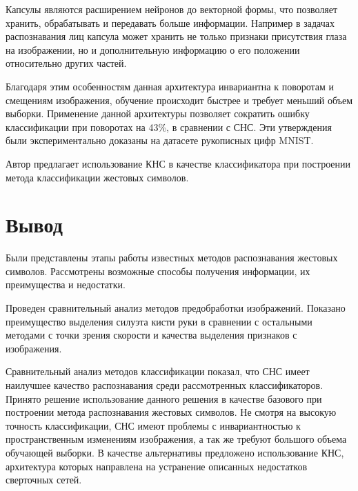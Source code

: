 Капсулы являются расширением нейронов до векторной формы, что позволяет хранить, обрабатывать и передавать больше информации. Например в задачах распознавания лиц капсула может хранить не только признаки присутствия глаза на изображении, но и дополнительную информацию о его положении относительно других частей.

Благодаря этим особенностям данная архитектура инвариантна к поворотам и смещениям изображения, обучение происходит быстрее и требует меньший объем выборки. Применение данной архитектуры позволяет сократить ошибку классификации при поворотах на 43\%, в сравнении с СНС\cite{em}. Эти утверждения были экспериментально доказаны на датасете рукописных цифр MNIST\cite{sabour2017dynamic}.

Автор предлагает использование КНС в качестве классификатора при построении метода классификации жестовых символов.

\section{Вывод}

Были представлены этапы работы известных методов распознавания жестовых символов. Рассмотрены возможные способы получения информации, их преимущества и недостатки. 

Проведен сравнительный анализ методов предобработки изображений. Показано преимущество выделения силуэта кисти руки в сравнении с остальными методами с точки зрения скорости и качества выделения признаков с изображения.

Сравнительный анализ методов классификации показал, что СНС имеет наилучшее качество распознавания среди рассмотренных классификаторов. Принято решение использование данного решения в качестве базового при построении метода распознавания жестовых символов. Не смотря на высокую точность классификации, СНС имеют проблемы с инвариантностью к пространственным изменениям изображения, а так же требуют большого объема обучающей выборки. В качестве альтернативы предложено использование КНС, архитектура которых направлена на устранение описанных недостатков сверточных сетей.